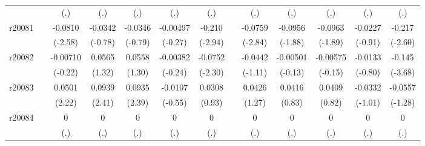 {\begin{tabular}{l*{12}{c}}
            &                     &         (.)         &         (.)         &         (.)         &         (.)         &         (.)         &                     &         (.)         &         (.)         &         (.)         &         (.)         &         (.)         \\
[1em]
r20081      &                     &     -0.0810\sym{*}  &     -0.0342         &     -0.0346         &    -0.00497         &      -0.210\sym{**} &                     &     -0.0759\sym{**} &     -0.0956         &     -0.0963         &     -0.0227         &      -0.217\sym{*}  \\
            &                     &     (-2.58)         &     (-0.78)         &     (-0.79)         &     (-0.27)         &     (-2.94)         &                     &     (-2.84)         &     (-1.88)         &     (-1.89)         &     (-0.91)         &     (-2.60)         \\
[1em]
r20082      &                     &    -0.00710         &      0.0565         &      0.0558         &    -0.00382         &     -0.0752\sym{*}  &                     &     -0.0442         &    -0.00501         &    -0.00575         &     -0.0133         &      -0.145\sym{***}\\
            &                     &     (-0.22)         &      (1.32)         &      (1.30)         &     (-0.24)         &     (-2.30)         &                     &     (-1.11)         &     (-0.13)         &     (-0.15)         &     (-0.80)         &     (-3.68)         \\
[1em]
r20083      &                     &      0.0501\sym{*}  &      0.0939\sym{*}  &      0.0935\sym{*}  &     -0.0107         &      0.0308         &                     &      0.0426         &      0.0416         &      0.0409         &     -0.0332         &     -0.0557         \\
            &                     &      (2.22)         &      (2.41)         &      (2.39)         &     (-0.55)         &      (0.93)         &                     &      (1.27)         &      (0.83)         &      (0.82)         &     (-1.01)         &     (-1.28)         \\
[1em]
r20084      &                     &           0         &           0         &           0         &           0         &           0         &                     &           0         &           0         &           0         &           0         &           0         \\
            &                     &         (.)         &         (.)         &         (.)         &         (.)         &         (.)         &                     &         (.)         &         (.)         &         (.)         &         (.)         &         (.)         \\

\end{tabular}}
